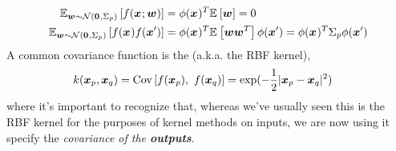 \documentclass[11pt]{article}
\begin{document}
\begin{align}
	\E[\vec w \sim \mathcal{N}(\vec 0, \Sigma_p)]{f(\vec x; \vec w)} 
		&= \phi(\vec x)^T \E{\vec w} = 0 \\
	\E[\vec w \sim \mathcal{N}(\vec 0, \Sigma_p)]{f(\vec x) f(\vec x')} 
		&= \phi(\vec x)^T \E{\vec w \vec w^T}\phi(\vec x')
		= \phi(\vec x)^T \Sigma_p \phi(\vec x') 
\end{align}
A common covariance function is the  (a.k.a. the RBF kernel),
\begin{align}
	k(\vec[p]{x}, \vec[q]{x})
		&= \Cov{f(\vec[p]{x})}{f(\vec[q]{x})}
		= \exp(-\onehalf |\vec[p]{x} - \vec[q]{x}|^2)
\end{align}
where it's important to recognize that, whereas we've usually seen this is the RBF kernel for the purposes of kernel methods on inputs, we are now using it specify the \textit{covariance of the \textbf{outputs}}. \\
\end{document}
